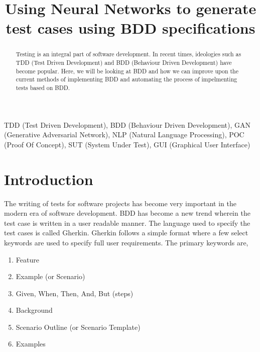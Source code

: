 \documentclass[conference]{IEEEtran}
\begin{document}
\title{Using Neural Networks to generate test cases using BDD specifications}

\author{
}

\maketitle

\begin{abstract}
Testing is an integral part of software development. In recent times, ideologies such as TDD (Test Driven Development) and BDD (Behaviour Driven Development) have become popular. Here, we will be looking at BDD and how we can improve upon the current methods of implementing BDD and automating the process of impelmenting tests based on BDD. 
\end{abstract}

\begin{IEEEkeywords}
TDD (Test Driven Development), BDD (Behaviour Driven Development), GAN (Generative Adversarial Network), NLP (Natural Language Processing), POC (Proof Of Concept), SUT (System Under Test), GUI (Graphical User Interface)
\end{IEEEkeywords}

\section{Introduction}
The writing of tests for software projects has become very important in the modern era of software development. BDD has become a new trend wherein the test case is written in a user readable manner. The language used to specify the test cases is called Gherkin. Gherkin follows a simple format where a few select keywords are used to specify full user requirements.\cite{a1} The primary keywords are,
\begin{enumerate}
	\item Feature
	\item Example (or Scenario)
	\item Given, When, Then, And, But (steps)
	\item Background
	\item Scenario Outline (or Scenario Template)
	\item Examples
\end{enumerate}
\end{document}

